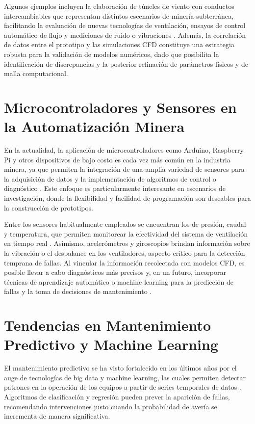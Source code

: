 Algunos ejemplos incluyen la elaboración de túneles de viento con conductos intercambiables que representan distintos escenarios de minería subterránea, facilitando la evaluación de nuevas tecnologías de ventilación, ensayos de control automático de flujo y mediciones de ruido o vibraciones \cite{Sanchis2022}. Además, la correlación de datos entre el prototipo y las simulaciones CFD constituye una estrategia robusta para la validación de modelos numéricos, dado que posibilita la identificación de discrepancias y la posterior refinación de parámetros físicos y de malla computacional.

\section{Microcontroladores y Sensores en la Automatización Minera}
En la actualidad, la aplicación de microcontroladores como Arduino, Raspberry Pi y otros dispositivos de bajo costo es cada vez más común en la industria minera, ya que permiten la integración de una amplia variedad de sensores para la adquisición de datos y la implementación de algoritmos de control o diagnóstico \cite{Beagle2019}. Este enfoque es particularmente interesante en escenarios de investigación, donde la flexibilidad y facilidad de programación son deseables para la construcción de prototipos.

Entre los sensores habitualmente empleados se encuentran los de presión, caudal y temperatura, que permiten monitorear la efectividad del sistema de ventilación en tiempo real \cite{Kumar2020}. Asimismo, acelerómetros y giroscopios brindan información sobre la vibración o el desbalance en los ventiladores, aspecto crítico para la detección temprana de fallas. Al vincular la información recolectada con modelos CFD, es posible llevar a cabo diagnósticos más precisos y, en un futuro, incorporar técnicas de aprendizaje automático o machine learning para la predicción de fallas y la toma de decisiones de mantenimiento \cite{Koopman2018}.

\section{Tendencias en Mantenimiento Predictivo y Machine Learning}
El mantenimiento predictivo se ha visto fortalecido en los últimos años por el auge de tecnologías de big data y machine learning, las cuales permiten detectar patrones en la operación de los equipos a partir de series temporales de datos \cite{Zhu2021}. Algoritmos de clasificación y regresión pueden prever la aparición de fallas, recomendando intervenciones justo cuando la probabilidad de avería se incrementa de manera significativa.

